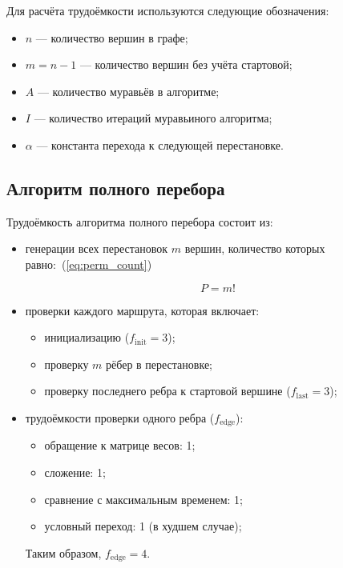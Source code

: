Для расчёта трудоёмкости используются следующие обозначения:
\begin{itemize}
	\item $n$ --- количество вершин в графе;
	\item $m = n-1$ --- количество вершин без учёта стартовой;
	\item $A$ --- количество муравьёв в алгоритме;
	\item $I$ --- количество итераций муравьиного алгоритма;
	\item $\alpha$ --- константа перехода к следующей перестановке.
\end{itemize}

\subsection{Алгоритм полного перебора}

Трудоёмкость алгоритма полного перебора состоит из:

\begin{itemize}
	\item генерации всех перестановок $m$ вершин, количество которых равно:~(\ref{eq:perm_count})
	
	\begin{equation}
		\label{eq:perm_count}
		P = m!
	\end{equation}
	
	\item проверки каждого маршрута, которая включает:
	\begin{itemize}
		\item инициализацию ($f_{\text{init}} = 3$);
		\item проверку $m$ рёбер в перестановке;
		\item проверку последнего ребра к стартовой вершине ($f_{\text{last}} = 3$);
	\end{itemize}
	
	\item трудоёмкости проверки одного ребра ($f_{\text{edge}}$):
	\begin{itemize}
		\item обращение к матрице весов: 1;
		\item сложение: 1;
		\item сравнение с максимальным временем: 1;
		\item условный переход: 1 (в худшем случае);
	\end{itemize}
	
	Таким образом, $f_{\text{edge}} = 4$.
\end{itemize}

